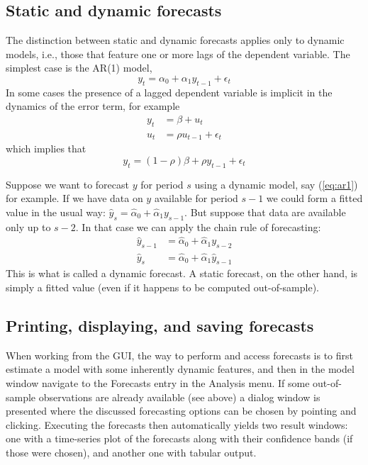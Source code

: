 \subsection{Static and dynamic forecasts}

The distinction between static and dynamic forecasts applies only to
dynamic models, i.e., those that feature one or more lags of the
dependent variable. The simplest case is the AR(1) model,
%
\begin{equation}
\label{eq:ar1}
y_t = \alpha_0 + \alpha_1 y_{t-1} + \epsilon_t
\end{equation}
%
In some cases the presence of a lagged dependent variable is implicit
in the dynamics of the error term, for example
%
\begin{align*}
  y_t &=  \beta + u_t \\
  u_t &= \rho u_{t-1} + \epsilon_t
\end{align*}
%
which implies that
%
\[
y_t = (1-\rho) \beta + \rho y_{t-1} + \epsilon_t
\]

Suppose we want to forecast $y$ for period $s$ using a dynamic model,
say (\ref{eq:ar1}) for example.  If we have data on $y$ available for
period $s-1$ we could form a fitted value in the usual way: $\hat{y}_s
= \hat{\alpha}_0 + \hat{\alpha}_1 y_{s-1}$.  But suppose that data are
available only up to $s-2$.  In that case we can apply the chain rule
of forecasting:
%
\begin{align*}
  \hat{y}_{s-1} &= \hat{\alpha}_0 + \hat{\alpha}_1 y_{s-2} \\
  \hat{y}_{s} &= \hat{\alpha}_0 + \hat{\alpha}_1 \hat{y}_{s-1}
\end{align*}
%
This is what is called a dynamic forecast.  A static forecast, on the
other hand, is simply a fitted value (even if it happens to be computed
out-of-sample).

\subsection{Printing, displaying, and saving forecasts}

When working from the GUI, the way to perform and access forecasts is to
first estimate a model with some inherently dynamic features, and then 
in the model window navigate to the Forecasts entry in the Analysis 
menu. If some out-of-sample observations are already available (see 
above) a dialog window is presented where the discussed forecasting 
options can be chosen by pointing and clicking. Executing the forecasts
then automatically yields two result windows: one with a time-series
plot of the forecasts along with their confidence bands (if those were
chosen), and another one with tabular output.

